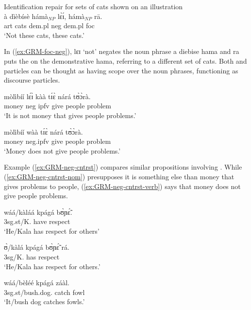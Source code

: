 \begin{exe}
\begin{exe}
\begin{exe}
\begin{exe}
\begin{exe}
\begin{exe}
\begin{exe}
\begin{exe}
\begin{exe}
\begin{exe}
 \ea\label{ex:GRM-foc-neg}{\rm Identification repair for sets of cats shown on an illustration}\\
 \gll {\ob}à dìèbísè hámà{\cb}$_{NP}$ lɛ̀ɪ́, {\ob}hámà{\cb}$_{NP}$ rā.\\
  {\sc art} cats {\sc dem.pl} {\sc neg}  {\sc dem.pl} {\sc foc}\\
 \glt   `Not these cats, {\sc these cats}.'

\z

In  (\ref{ex:GRM-foc-neg}), {\sls lɛɪ} `not' negates the noun phrase {\sls a 
diebise hama} and {\sls ra} puts the  on the demonstrative  {\sls hama}, referring to a different set of cats.  Both  and  particles can be thought as having scope over the noun phrases, functioning as discourse 
particles. 


\ea\label{ex:GRM-neg-cntrst}
  \ea\label{ex:GRM-neg-cntrst-nom}

 \gll  mòlìbíí lɛ́ɪ̀  kàà tɪ́ɛ̀ nárá tʊ̀ɔ̀rà.\\
 money {\sc neg} {\sc ipfv} give people problem\\
 \glt  `It is not money that gives people problems.'

 
  \ex\label{ex:GRM-neg-cntrst-verb}
 \gll   mòlìbíí wàà tɪ́ɛ̀ nárá tʊ̀ɔ̀rà.\\
 money {\sc neg.ipfv} give people problem\\
 \glt  `Money does not give people problems.'

\z
\z

Example ({\ref{ex:GRM-neg-cntrst}}) compares similar propositions involving . While 
({\ref{ex:GRM-neg-cntrst-nom}}) presupposes   it is something else than money  that gives  problems 
to people,  ({\ref{ex:GRM-neg-cntrst-verb}}) says that money does not give people problems.




\ea\label{ex:GRM-foc-lenght}
  \ea\label{ex:GRM-foc-w-lenght}
 \gll wáá/kàláá kpágá bʊ̀ɲɛ̃́.\\
 {\sc 3sg.st}/K.{\foc}  have respect\\
 \glt  `{\sc He/Kala} has respect for others'

   \ex\label{ex:GRM-foc-n-lenght} 
 \gll ʊ̀/kàlá kpágá bʊ̀ɲɛ̃́ rá.\\
{\sc 3sg}/K.  has respect {\foc}\\
\glt `He/Kala has {\sc respect for others}.' 

 \ex\label{ex:GRM-foc-w-lenght-2} 
\gll  wáá/bèléé kpágá záàl.\\
 {\sc 3sg.st}/bush.dog.{\foc}    catch fowl\\
 \glt   `{\sc It/bush dog} catches fowls.'


\end{exe}
\end{exe}
\end{exe}
\end{exe}
\end{exe}
\end{exe}
\end{exe}
\end{exe}
\end{exe}
\end{exe}
